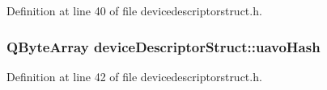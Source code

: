 \-Definition at line 40 of file devicedescriptorstruct.\-h.

\hypertarget{group___u_a_v_object_util_plugin_gaa4639a6c66d44d1f5e0bf6c22c5eec64}{
\subsubsection[{uavo\-Hash}]{\setlength{\rightskip}{0pt plus 5cm}\-Q\-Byte\-Array {\bf device\-Descriptor\-Struct\-::uavo\-Hash}}}\label{group___u_a_v_object_util_plugin_gaa4639a6c66d44d1f5e0bf6c22c5eec64}


\-Definition at line 42 of file devicedescriptorstruct.\-h.

